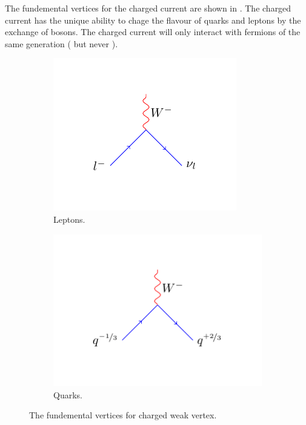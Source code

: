 The fundemental vertices for the charged current are shown in
. The charged current has the unique ability to chage the
flavour of quarks and leptons by the exchange of \PW bosons. The charged current
will only interact with fermions of the same generation
(\HepProcess{\Pelectron\to\Pnue} but never
\HepProcess{\Pelectron\to\Pnum}).

\begin{figure}[htbp]
  \centering
  \begin{subfigure}{0.45\textwidth}
    \centering
    \includegraphics[width=\textwidth]{weak_charged_lepton_process}
    \caption{Leptons.}
    \label{fig:weak_charged_lepton_process}
  \end{subfigure}
  \begin{subfigure}{0.45\textwidth}
    \centering
    \includegraphics[width=\textwidth]{weak_charged_quark_process}
    \caption{Quarks.}
    \label{fig:weak_charged_quark_process}
  \end{subfigure}
  \caption{The fundemental vertices for charged weak vertex.}
  \label{fig:weak_charged}
\end{figure}

